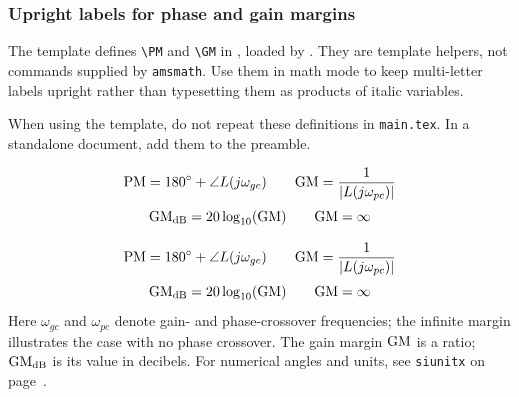 \par
{}
\subsubsection*{Upright labels for phase and gain margins}
The template defines \verb|\PM| and \verb|\GM| in
, loaded by
. They are template helpers,
not commands supplied by \texttt{amsmath}. Use them in math mode
to keep multi-letter labels upright rather than typesetting them
as products of italic variables.

\begin{referencecode}
\newcommand{\PM}{\mathrm{PM}}
\newcommand{\GM}{\mathrm{GM}}
\end{referencecode}
When using the template, do not repeat these definitions in
\texttt{main.tex}. In a standalone document, add them to the preamble.

\begin{referencecode}
\[
    \PM = 180^\circ + \angle L(j\omega_{gc})
    \qquad \GM = \frac{1}{|L(j\omega_{pc})|}
\]
\[
    \GM_{\mathrm{dB}} = 20\log_{10}(\GM)
    \qquad \GM = \infty
\]
\end{referencecode}

\[
    \PM = 180^\circ + \angle L(j\omega_{gc})
    \qquad \GM = \frac{1}{|L(j\omega_{pc})|}
\]
\[
    \GM_{\mathrm{dB}} = 20\log_{10}(\GM)
    \qquad \GM = \infty
\]
Here \(\omega_{gc}\) and \(\omega_{pc}\) denote gain- and
phase-crossover frequencies; the infinite margin illustrates the
case with no phase crossover. The gain margin \(\GM\) is a ratio;
\(\GM_{\mathrm{dB}}\) is its value in decibels. For numerical
angles and units, see \texttt{siunitx} on page~\pageref{units}.
\par

